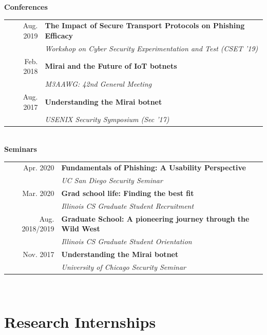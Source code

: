 \documentclass[10pt,singlecolumn]{article} %
\begin{document}
\textbf{Conferences}\\

\begin{tabular}{rl}
Aug. 2019 & \textbf{The Impact of Secure Transport Protocols on Phishing Efficacy} \\
& \emph{Workshop on Cyber Security Experimentation and Test (CSET '19)} \\
Feb. 2018 & \textbf{Mirai and the Future of IoT botnets}\\
& \emph{M3AAWG: 42nd General Meeting} \\ 
Aug. 2017 & \textbf{Understanding the Mirai botnet} \\
& \emph{USENIX Security Symposium (Sec '17)} \\ 
\end{tabular} \\

\vspace{0.3cm}
\textbf{Seminars}\\

\begin{tabular}{rl}
Apr. 2020 & \textbf{Fundamentals of Phishing: A Usability Perspective}\\
& \emph{UC San Diego Security Seminar}\\

Mar. 2020 & \textbf{Grad school life: Finding the best fit}\\
& \emph{Illinois CS Graduate Student Recruitment}\\

Aug. 2018/2019 & \textbf{Graduate School: A pioneering journey through the Wild West}\\
& \emph{Illinois CS Graduate Student Orientation}\\

Nov. 2017 & \textbf{Understanding the Mirai botnet}\\
& \emph{University of Chicago Security Seminar}\\
\end{tabular} \\




\section{Research Internships} 
\end{document}
